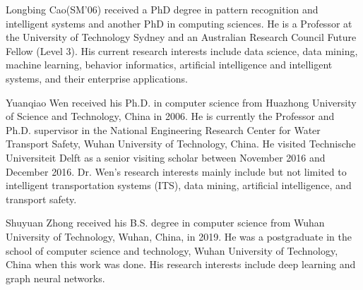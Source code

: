 \documentclass[journal]{IEEEtran}
\begin{document}
\begin{IEEEbiography}{Longbing Cao}(SM'06) received a PhD degree in pattern recognition and intelligent systems and another PhD in computing sciences. He is a Professor at the University of Technology Sydney and an Australian Research Council Future Fellow (Level 3). His current research interests include data science, data mining, machine learning, behavior informatics, artificial intelligence and intelligent systems, and their enterprise applications.
\end{IEEEbiography}

\begin{IEEEbiography}{Yuanqiao Wen} received his Ph.D. in computer science from Huazhong University of Science and Technology, China in 2006. He is currently the Professor and Ph.D. supervisor in the National Engineering Research Center for Water Transport Safety, Wuhan University of Technology, China. He visited Technische Universiteit Delft as a senior visiting scholar between November 2016 and December 2016. Dr. Wen’s research interests mainly include but not limited to intelligent transportation systems (ITS), data mining, artificial intelligence, and transport safety.
\end{IEEEbiography}

\begin{IEEEbiography}{Shuyuan Zhong} received his B.S. degree in computer science from Wuhan University of Technology, Wuhan, China, in 2019. He was a postgraduate in the school of computer science and technology, Wuhan University of Technology, China when this work was done. His research interests include deep learning and graph neural networks.
\end{IEEEbiography}
\end{document}
